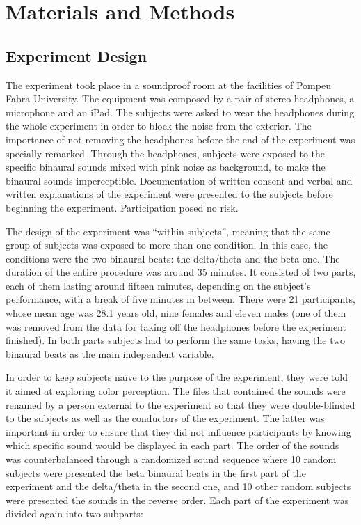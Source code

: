 \documentclass[10pt]{article}
\begin{document}
\section*{Materials and Methods}
\subsection*{Experiment Design}
The experiment took place in a soundproof room at the facilities of Pompeu Fabra University. The equipment was composed by a pair of stereo headphones, a microphone and an iPad. The subjects were asked to wear the headphones during the whole experiment in order to block the noise from the exterior. The importance of not removing the headphones before the end of the experiment was specially remarked. Through the headphones, subjects were exposed to the specific binaural sounds mixed with pink noise as background, to make the binaural sounds imperceptible. Documentation of written consent and verbal and written explanations of the experiment were presented to the subjects before beginning the experiment. Participation posed no risk. 
 
The design of the experiment was “within subjects”, meaning that the same group of subjects was exposed to more than one condition. In this case, the conditions were the two binaural beats: the delta/theta and the beta one. The duration of the entire procedure was around 35 minutes. It consisted of two parts, each of them lasting around fifteen minutes, depending on the subject’s performance, with a break of five minutes in between. There were 21 participants, whose mean age was 28.1 years old, nine females and eleven males (one of them was removed from the data for taking off the headphones before the experiment finished). In both parts subjects had to perform the same tasks, having the two binaural beats as the main independent variable.
 
In order to keep subjects naïve to the purpose of the experiment, they were told it aimed at exploring color perception. The files that contained the sounds were renamed by a person external to the experiment so that they were double-blinded to the subjects as well as the conductors of the experiment. The latter was important in order to ensure that they did not influence participants by knowing which specific sound would be displayed in each part. The order of the sounds was counterbalanced through a randomized sound sequence where 10 random subjects were presented the beta binaural beats in the first part of the experiment and the delta/theta in the second one, and 10 other random subjects were presented the sounds in the reverse order. Each part of the experiment was divided again into two subparts:
\end{document}
